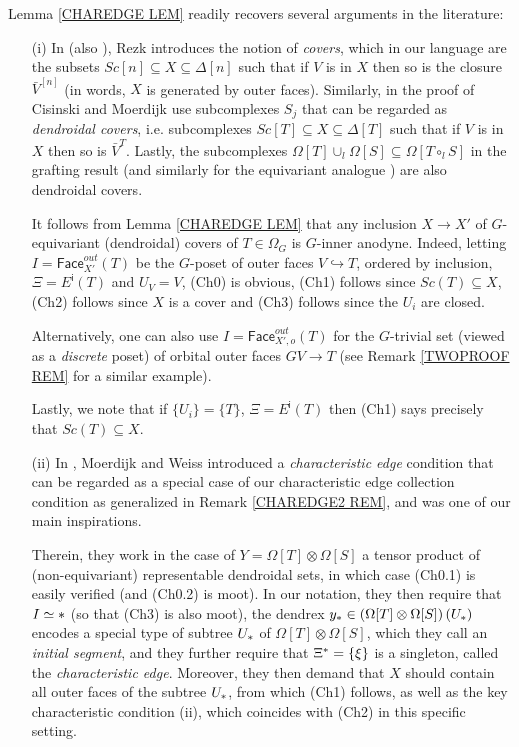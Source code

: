 \documentclass[a4paper,10pt,draft]{article}%
\begin{document}
\begin{remark} Lemma \ref{CHAREDGE LEM} readily recovers several arguments in the literature:
\begin{itemize}
\item[(i)] In \cite[\S 10]{Rez01} (also \cite[\S 6.2]{Rez10}), Rezk introduces the notion of \textit{covers}, which in our language are the subsets
$Sc[n] \subseteq X \subseteq \Delta[n]$
such that if $V$ is in $X$ then so is the closure $\bar{V}^{[n]}$
(in words, $X$ is generated by outer faces).
Similarly, in the proof of \cite[Prop. 2.4]{CM13a}
Cisinski and Moerdijk use subcomplexes $S_j$ that can be regarded as
\textit{dendroidal covers},
i.e. subcomplexes
$Sc[T] \subseteq X \subseteq \Delta[T]$
such that if $V$ is in $X$ then so is $\bar{V}^{T}$.
Lastly, the subcomplexes 
$\Omega[T] \cup_l \Omega[S] \subseteq \Omega[T \circ_l S]$
in the grafting result \cite[Lemma 5.2]{MW09} (and similarly for the equivariant analogue \cite[Prop. 6.19]{Per17}) are also dendroidal covers.

It follows from Lemma \ref{CHAREDGE LEM}
that any inclusion $X \to X'$ of $G$-equivariant (dendroidal) covers of $T\in \Omega_G$
is $G$-inner anodyne. 
Indeed, letting $I=\mathsf{Face}_{X'}^{out}(T)$ be the $G$-poset of outer faces $V \hookrightarrow T$, ordered by inclusion, 
$\Xi = E^{\mathsf{i}}(T)$ and $U_V = V$,
(Ch0) is obvious, (Ch1) follows since 
$Sc(T) \subseteq X$, (Ch2) follows since $X$ is a cover and
(Ch3) follows since the $U_i$ are closed.

Alternatively, one can also use $I=\mathsf{Face}_{X',o}^{out}(T)$
for the $G$-trivial set (viewed as a \textit{discrete} poset)
of orbital outer faces $GV \to T$ (see Remark \ref{TWOPROOF REM} for a similar example).

Lastly, we note that if $\{U_i\}=\{T\}$, $\Xi=E^{\mathsf{i}}(T)$
then (Ch1) says precisely that $Sc(T) \subseteq X$.


\item[(ii)] In \cite[Lemma 9.7]{MW09}, Moerdijk and Weiss introduced a \textit{characteristic edge} condition that can be regarded as a special case of our characteristic edge collection condition as generalized in Remark \ref{CHAREDGE2 REM}, and was one of our main inspirations.

Therein, they work in the case of $Y= \Omega[T] \otimes \Omega[S]$
a tensor product of (non-equivariant) representable dendroidal sets, in which case (Ch0.1) is easily verified (and (Ch0.2) is moot).
In our notation, they then require that $I \simeq \**$ (so that (Ch3) is also moot), 
the dendrex 
$y_{\**} \in \left(\Omega[T] \otimes \Omega[S]\right)(U_{\**})$ encodes a special type of subtree $U_{\**}$ of $\Omega[T] \otimes \Omega[S]$, which they call an \textit{initial segment},
and they further require that $\Xi^{\**} = \{\xi\}$ is a singleton, called the \textit{characteristic edge}.
Moreover, they then demand that $X$ should contain all outer faces of the subtree $U_{\**}$, from which (Ch1) follows, 
as well as the key characteristic condition 
\cite[Lemma 9.7]{MW09}(ii),
which coincides with (Ch2) in this specific setting.


\end{itemize}
\end{remark}
\end{document}
